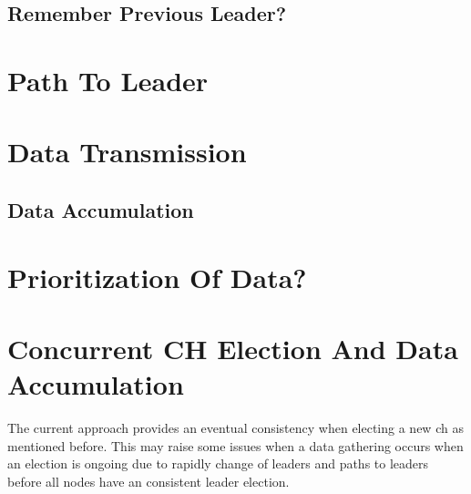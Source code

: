 \documentclass[USenglish]{uit-thesis}
\begin{document}
\subsection{Remember Previous Leader?}




\section{Path To Leader}


\section{Data Transmission}



\subsection{Data Accumulation}


\section{Prioritization Of Data?}

\section{Concurrent CH Election And Data Accumulation} \label{disc:simult_el_acc}
The current approach provides an eventual consistency when electing a new \gls{ch} as mentioned before. This may raise some issues when a data gathering occurs when an election is ongoing due to rapidly change of leaders and paths to leaders before all nodes have an consistent leader election.
\end{document}
